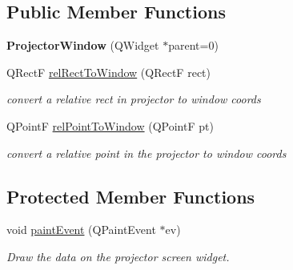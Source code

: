 \subsection*{Public Member Functions}
\begin{DoxyCompactItemize}
\item 
{\bfseries Projector\+Window} (Q\+Widget $\ast$parent=0)\hypertarget{classProjectorWindow_a35e759b05a4db4dd077f8b9255363a9c}{}\label{classProjectorWindow_a35e759b05a4db4dd077f8b9255363a9c}

\item 
Q\+RectF \hyperlink{classProjectorWindow_a87c0dc2e5b690d5832a22106a9f28ac7}{rel\+Rect\+To\+Window} (Q\+RectF rect)\hypertarget{classProjectorWindow_a87c0dc2e5b690d5832a22106a9f28ac7}{}\label{classProjectorWindow_a87c0dc2e5b690d5832a22106a9f28ac7}

\begin{DoxyCompactList}\small\item\em convert a relative rect in projector to window coords \end{DoxyCompactList}\item 
Q\+PointF \hyperlink{classProjectorWindow_a4f033d3ecd11f6afbc4c076402b9e628}{rel\+Point\+To\+Window} (Q\+PointF pt)\hypertarget{classProjectorWindow_a4f033d3ecd11f6afbc4c076402b9e628}{}\label{classProjectorWindow_a4f033d3ecd11f6afbc4c076402b9e628}

\begin{DoxyCompactList}\small\item\em convert a relative point in the projector to window coords \end{DoxyCompactList}\end{DoxyCompactItemize}
\subsection*{Protected Member Functions}
\begin{DoxyCompactItemize}
\item 
void \hyperlink{classProjectorWindow_ab0ddec0ab394bc4a987ac26522d065dd}{paint\+Event} (Q\+Paint\+Event $\ast$ev)
\begin{DoxyCompactList}\small\item\em Draw the data on the projector screen widget. \end{DoxyCompactList}\end{DoxyCompactItemize}
